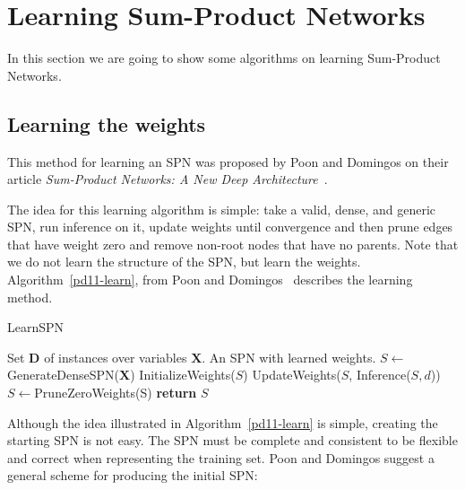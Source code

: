 \documentclass[a4paper,10pt]{article}
\theoremstyle{plain}
\begin{document}
\section{Learning Sum-Product Networks}

In this section we are going to show some algorithms on learning Sum-Product Networks.

\subsection{Learning the weights}

This method for learning an SPN was proposed by Poon and Domingos on their article
\textit{Sum-Product Networks: A New Deep Architecture}~\cite{poon-domingos}.

The idea for this learning algorithm is simple: take a valid, dense, and generic SPN, run inference
on it, update weights until convergence and then prune edges that have weight zero and remove
non-root nodes that have no parents. Note that we do not learn the structure of the SPN, but learn
the weights. Algorithm~\ref{pd11-learn}, from Poon and Domingos~\cite{poon-domingos} describes the
learning method.

\begin{algorithm}
  \caption{LearnSPN}\label{pd11-learn}
  \begin{algorithmic}[1]
    \Require Set $\mathbf{D}$ of instances over variables $\mathbf{X}$.
    \Ensure An SPN with learned weights.
    \State $S \gets $GenerateDenseSPN($\mathbf{X}$)
    \State InitializeWeights($S$)
    \Repeat
      \State UpdateWeights($S$, Inference($S,d$))
      \EndFor
    \State $S \gets $PruneZeroWeights(S)
    \State \textbf{return} $S$
  \end{algorithmic}
\end{algorithm}

Although the idea illustrated in Algorithm~\ref{pd11-learn} is simple, creating the starting SPN is
not easy. The SPN must be complete and consistent to be flexible and correct when representing the
training set. Poon and Domingos suggest a general scheme for producing the initial
SPN\@:
\end{document}
